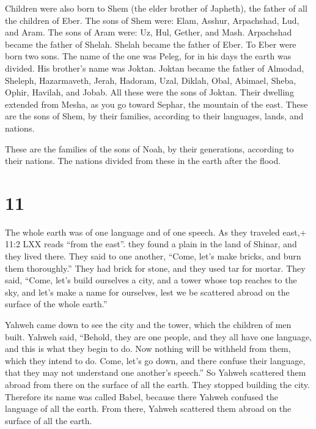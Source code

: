  Children were also born to Shem (the elder brother of
Japheth), the father of all the children of Eber.  The sons
of Shem were: Elam, Asshur, Arpachshad, Lud, and Aram.  The
sons of Aram were: Uz, Hul, Gether, and Mash.  Arpachshad
became the father of Shelah. Shelah became the father of Eber.
 To Eber were born two sons. The name of the one was Peleg,
for in his days the earth was divided. His brother's name was Joktan.
 Joktan became the father of Almodad, Sheleph, Hazarmaveth,
Jerah,  Hadoram, Uzal, Diklah,  Obal, Abimael,
Sheba,  Ophir, Havilah, and Jobab. All these were the sons
of Joktan.  Their dwelling extended from Mesha, as you go
toward Sephar, the mountain of the east.  These are the
sons of Shem, by their families, according to their languages, lands,
and nations.

 These are the families of the sons of Noah, by their
generations, according to their nations. The nations divided from these
in the earth after the flood.

\hypertarget{section-10}{%
\section{11}\label{section-10}}

 The whole earth was of one language and of one speech.
 As they traveled east,+ 11:2 LXX reads ``from the east''.
they found a plain in the land of Shinar, and they lived there.
 They said to one another, ``Come, let's make bricks, and
burn them thoroughly.'' They had brick for stone, and they used tar for
mortar.  They said, ``Come, let's build ourselves a city,
and a tower whose top reaches to the sky, and let's make a name for
ourselves, lest we be scattered abroad on the surface of the whole
earth.''

 Yahweh came down to see the city and the tower, which the
children of men built.  Yahweh said, ``Behold, they are one
people, and they all have one language, and this is what they begin to
do. Now nothing will be withheld from them, which they intend to do.
 Come, let's go down, and there confuse their language, that
they may not understand one another's speech.''  So Yahweh
scattered them abroad from there on the surface of all the earth. They
stopped building the city.  Therefore its name was called
Babel, because there Yahweh confused the language of all the earth. From
there, Yahweh scattered them abroad on the surface of all the earth.

